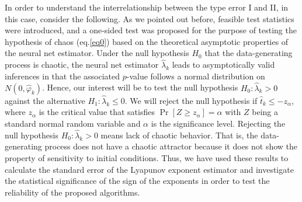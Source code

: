 In order to understand the interrelationship between the type error I and II, in this case, consider the following. As we pointed out before, feasible test statistics were introduced, and a one-sided test was proposed for the purpose of testing the hypothesis of chaos (eq.\ref{eq0}) based on the theoretical asymptotic properties of the neural net estimator. Under the null hypothesis $H_0$ that the data-generating process is chaotic, the neural net estimator ${{\hat \lambda }_k}$ leads to asymptotically valid inferences in that the associated $p$-value follows a normal distribution on $N\left( {0,{{\hat \varphi }_k}} \right)$. Hence, our interest will be to test the null hypothesis ${H_0}:{{\hat \lambda }_k} > 0$ against the alternative ${H_1}:{{\hat \lambda }_k} \leqslant 0$. We will reject the null hypothesis if ${{\hat t}_k} \leqslant  - {z_\alpha }$, where ${{z_\alpha }}$ is the critical value that satisfies $\Pr \left[ {Z \geqslant {z_\alpha }} \right] = \alpha$ with $Z$ being a standard normal random variable and $\alpha$ is the significance level. Rejecting the null hypothesis ${H_0}:{{\hat \lambda }_k} > 0$ means lack of chaotic behavior. That is, the data-generating process does not have a chaotic attractor because it does not show the property of sensitivity to initial conditions. Thus, we have used these results to calculate the standard error of the Lyapunov exponent estimator and investigate the statistical significance of the sign of the exponents in order to test the reliability of the proposed algorithms.

